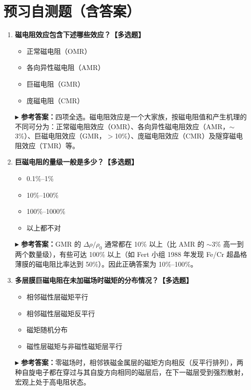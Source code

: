\documentclass[12pt,a4paper]{article}
\newcommand{\answer}[1]{\vspace{2pt}\noindent\textbf{\color{teal!80!black}▸ 参考答案：}#1\vspace{4pt}}
\begin{document}
\newpage

\section{\large 预习自测题（含答案）}

\noindent{}

\bigskip

\begin{enumerate}[label=\arabic*.]
    \item \textbf{磁电阻效应包含下述哪些效应？【多选题】}
    \begin{itemize}
        \item[\checkmark] 正常磁电阻（OMR）
        \item[\checkmark] 各向异性磁电阻（AMR）
        \item[\checkmark] 巨磁电阻（GMR）
        \item[\checkmark] 庞磁电阻（CMR）
    \end{itemize}
    \answer{四项全选。磁电阻效应是一个大家族，按磁电阻值和产生机理的不同可分为：正常磁电阻效应（OMR）、各向异性磁电阻效应（AMR，$\sim$3\%）、巨磁电阻效应（GMR，$>$10\%）、庞磁电阻效应（CMR）及隧穿磁电阻效应（TMR）等。}

    \item \textbf{巨磁电阻的量级一般是多少？【多选题】}
    \begin{itemize}
        \item 0.1\%--1\%
        \item[\checkmark] 10\%--100\%
        \item 100\%--1000\%
        \item 以上都不对
    \end{itemize}
    \answer{GMR 的 $\Delta\rho/\rho_0$ 通常都在 10\% 以上（比 AMR 的 $\sim$3\% 高一到两个数量级），有些可达 100\% 以上（如 Fert 小组 1988 年发现 Fe/Cr 超晶格薄膜的磁电阻比率达到 50\%）。因此正确答案为 10\%--100\%。}

    \item \textbf{多层膜巨磁电阻在未加磁场时磁矩的分布情况？【多选题】}
    \begin{itemize}
        \item 相邻磁性层磁矩平行
        \item[\checkmark] 相邻磁性层磁矩反平行
        \item 磁矩随机分布
        \item 磁性层磁矩与非磁性磁矩层平行
    \end{itemize}
    \answer{零磁场时，相邻铁磁金属层的磁矩方向相反（反平行排列），两种自旋电子都在穿过与其自旋方向相同的磁层后，在下一磁层受到强烈散射，宏观上处于高电阻状态。}


\end{enumerate}
\end{document}
